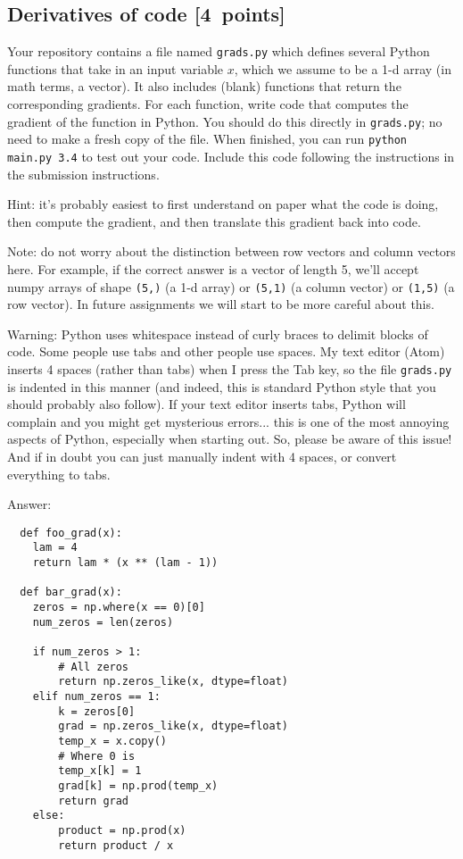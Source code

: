 \documentclass{article}
\newcommand{\blu}[1]{{\textcolor{blu}{#1}}}
\newenvironment{answer}{\par\begingroup\color{gre}Answer: }{\endgroup}
\let\ask\blu
\newcommand\pts[1]{\textcolor{pointscolour}{[#1~points]}}
\begin{document}
  \subsection{Derivatives of code \pts{4}}

  Your repository contains a file named \texttt{grads.py} which defines several Python functions that take in an input variable $x$, which we assume to be a 1-d array (in math terms, a vector).
  It also includes (blank) functions that return the corresponding gradients.
  For each function, \ask{write code that computes the gradient of the function} in Python.
  You should do this directly in \texttt{grads.py}; no need to make a fresh copy of the file. When finished, you can run \texttt{python main.py 3.4} to test out your code. \ask{Include this code following the instructions in the submission instructions.}

  Hint: it's probably easiest to first understand on paper what the code is doing, then compute
  the gradient, and then translate this gradient back into code.

  Note: do not worry about the distinction between row vectors and column vectors here.
  For example, if the correct answer is a vector of length 5, we'll accept numpy arrays
  of shape \texttt{(5,)} (a 1-d array) or \texttt{(5,1)} (a column vector) or
  \texttt{(1,5)} (a row vector). In future assignments we will start to be more careful
  about this.

  Warning: Python uses whitespace instead of curly braces to delimit blocks of code.
  Some people use tabs and other people use spaces. My text editor (Atom) inserts 4 spaces (rather than tabs) when
  I press the Tab key, so the file \texttt{grads.py} is indented in this manner (and indeed, this is standard Python style that you should probably also follow). If your text editor inserts tabs,
  Python will complain and you might get mysterious errors... this is one of the most annoying aspects
  of Python, especially when starting out. So, please be aware of this issue! And if in doubt you can just manually
  indent with 4 spaces, or convert everything to tabs.

  \begin{answer}
  \begin{verbatim}
  def foo_grad(x):
    lam = 4
    return lam * (x ** (lam - 1))

  def bar_grad(x):
    zeros = np.where(x == 0)[0]
    num_zeros = len(zeros)

    if num_zeros > 1:
        # All zeros
        return np.zeros_like(x, dtype=float)
    elif num_zeros == 1:
        k = zeros[0]
        grad = np.zeros_like(x, dtype=float)
        temp_x = x.copy()
        # Where 0 is
        temp_x[k] = 1
        grad[k] = np.prod(temp_x)
        return grad
    else:
        product = np.prod(x)
        return product / x
  \end{verbatim}
  \end{answer}
\end{document}
